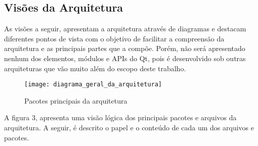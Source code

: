 \subsection{Visões da Arquitetura}
As visões a seguir, apresentam a arquitetura através de diagramas e destacam diferentes pontos de vista com o objetivo de facilitar a compreensão da arquitetura e as principais partes que a compõe. Porém, não será apresentado nenhum dos elementos, módulos e APIs do Qt, pois é desenvolvido sob outras arquiteturas que vão muito além do escopo deste trabalho.\par
\begin{figure}[h]
	\texttt{[image: diagrama\_geral\_da\_arquitetura]}
	\centering
	\caption{Pacotes principais da arquitetura}
\end{figure}
A figura 3, apresenta uma visão lógica dos principais pacotes e arquivos da arquitetura. A seguir, é descrito o papel e o conteúdo de cada um dos arquivos e pacotes.
